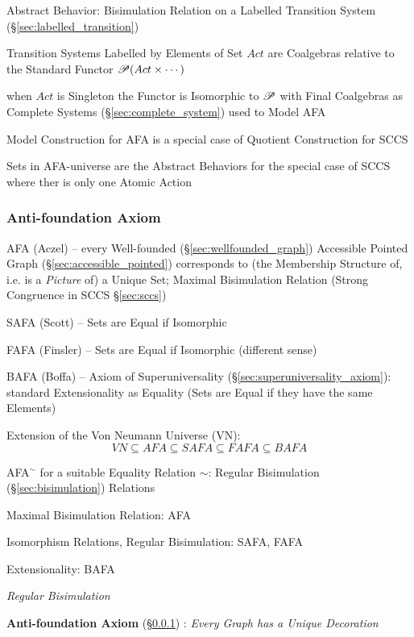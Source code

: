 Abstract Behavior: Bisimulation Relation on a Labelled Transition
System (\S\ref{sec:labelled_transition})

Transition Systems Labelled by Elements of Set $Act$ are Coalgebras
relative to the Standard Functor $\mathscr{P}(Act \times \cdots)$

when $Act$ is Singleton the Functor is Isomorphic to $\mathscr{P}$ with Final
Coalgebras as Complete Systems (\S\ref{sec:complete_system}) used to
Model AFA

Model Construction for AFA is a special case of Quotient Construction
for SCCS

Sets in AFA-universe are the Abstract Behaviors for the special case
of SCCS where ther is only one Atomic Action



\subsubsection{Anti-foundation Axiom}\label{sec:anti_foundation}

\cite{aczel88}

AFA (Aczel) -- every Well-founded (\S\ref{sec:wellfounded_graph})
Accessible Pointed Graph (\S\ref{sec:accessible_pointed}) corresponds
to (the Membership Structure of, i.e. is a \emph{Picture} of) a Unique
Set; Maximal Bisimulation Relation (Strong Congruence in SCCS
\S\ref{sec:sccs})

SAFA (Scott) -- Sets are Equal if Isomorphic

FAFA (Finsler) -- Sets are Equal if Isomorphic (different sense)

BAFA (Boffa) -- Axiom of Superuniversality
(\S\ref{sec:superuniversality_axiom}): standard Extensionality as
Equality (Sets are Equal if they have the same Elements)

Extension of the Von Neumann Universe (VN):
\[
  VN \subseteq AFA \subseteq SAFA \subseteq FAFA \subseteq BAFA
\]

AFA$^\sim$ for a suitable Equality Relation $\sim$: Regular
Bisimulation (\S\ref{sec:bisimulation}) Relations

Maximal Bisimulation Relation: AFA

Isomorphism Relations, Regular Bisimulation: SAFA, FAFA

Extensionality: BAFA

\emph{Regular Bisimulation} %



\textbf{Anti-foundation Axiom} (\S\ref{sec:anti_foundation})
\cite{aczel88}: \emph{Every Graph has a Unique Decoration}

